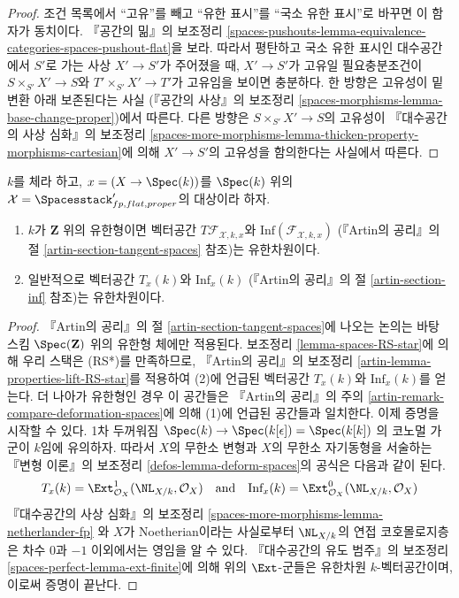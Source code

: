 \begin{proof}
조건 목록에서 ``고유''를 빼고 ``유한 표시''를 ``국소 유한 표시''로 바꾸면
이 함자가 동치이다. 『공간의 밂』의 보조정리
\ref{spaces-pushouts-lemma-equivalence-categories-spaces-pushout-flat}을 보라.
따라서 평탄하고 국소 유한 표시인 대수공간에서 $S'$로 가는 사상
$X' \to S'$가 주어졌을 때, $X' \to S'$가 고유일 필요충분조건이
$S \times_{S'} X' \to S$와 $T' \times_{S'} X' \to T'$가 고유임을 보이면
충분하다. 한 방향은 고유성이 밑변환 아래 보존된다는 사실
(『공간의 사상』의 보조정리 \ref{spaces-morphisms-lemma-base-change-proper})에서
따른다. 다른 방향은 $S \times_{S'} X' \to S$의 고유성이
『대수공간의 사상 심화』의 보조정리
\ref{spaces-more-morphisms-lemma-thicken-property-morphisms-cartesian}에 의해
$X' \to S'$의 고유성을 함의한다는 사실에서 따른다.
\end{proof}

\begin{lemma}
\label{lemma-spaces-tangent-space}
$k$를 체라 하고, $x = (X \to \Spec(k))$를 $\Spec(k)$ 위의
$\mathcal{X} = \Spacesstack'_{fp, flat, proper}$의 대상이라 하자.
\begin{enumerate}
\item $k$가 $\mathbf{Z}$ 위의 유한형이면 벡터공간
$T\mathcal{F}_{\mathcal{X}, k, x}$와
$\text{Inf}(\mathcal{F}_{\mathcal{X}, k, x})$
(『Artin의 공리』의 절 \ref{artin-section-tangent-spaces} 참조)는 유한차원이다.
\item 일반적으로 벡터공간 $T_x(k)$와 $\text{Inf}_x(k)$
(『Artin의 공리』의 절 \ref{artin-section-inf} 참조)는 유한차원이다.
\end{enumerate}
\end{lemma}

\begin{proof}
『Artin의 공리』의 절 \ref{artin-section-tangent-spaces}에 나오는 논의는
바탕 스킴 $\Spec(\mathbf{Z})$ 위의 유한형 체에만 적용된다. 보조정리
\ref{lemma-spaces-RS-star}에 의해 우리 스택은 (RS*)를 만족하므로,
『Artin의 공리』의 보조정리 \ref{artin-lemma-properties-lift-RS-star}를
적용하여 (2)에 언급된 벡터공간 $T_x(k)$와 $\text{Inf}_x(k)$를 얻는다.
더 나아가 유한형인 경우 이 공간들은 『Artin의 공리』의 주의
\ref{artin-remark-compare-deformation-spaces}에 의해 (1)에 언급된 공간들과
일치한다. 이제 증명을 시작할 수 있다. 1차 두꺼워짐
$\Spec(k) \to \Spec(k[\epsilon]) = \Spec(k[k])$
의 코노멀 가군이 $k$임에 유의하자. 따라서 $X$의 무한소 변형과 $X$의
무한소 자기동형을 서술하는 『변형 이론』의 보조정리
\ref{defos-lemma-deform-spaces}의 공식은 다음과 같이 된다.
$$
T_x(k) = \Ext^1_{\mathcal{O}_X}(\NL_{X/k}, \mathcal{O}_X)
\quad\text{and}\quad
\text{Inf}_x(k) = \Ext^0_{\mathcal{O}_X}(\NL_{X/k}, \mathcal{O}_X)
$$
『대수공간의 사상 심화』의 보조정리
\ref{spaces-more-morphisms-lemma-netherlander-fp}
와 $X$가 Noetherian이라는 사실로부터 $\NL_{X/k}$의 연접 코호몰로지층은
차수 $0$과 $-1$ 이외에서는 영임을 알 수 있다. 『대수공간의 유도 범주』의
보조정리 \ref{spaces-perfect-lemma-ext-finite}에 의해 위의 $\Ext$-군들은
유한차원 $k$-벡터공간이며, 이로써 증명이 끝난다.
\end{proof}

